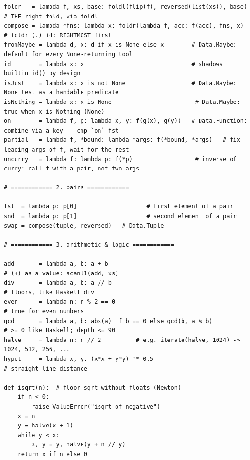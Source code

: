 \documentclass[10pt,letterpaper]{book}
\begin{document}
\begin{lstlisting}[style=file]
foldr   = lambda f, xs, base: foldl(flip(f), reversed(list(xs)), base)  # THE right fold, via foldl
compose = lambda *fns: lambda x: foldr(lambda f, acc: f(acc), fns, x)   # foldr (.) id: RIGHTMOST first
fromMaybe = lambda d, x: d if x is None else x        # Data.Maybe: default for every None-returning tool
id        = lambda x: x                               # shadows builtin id() by design
isJust    = lambda x: x is not None                   # Data.Maybe: None test as a handable predicate
isNothing = lambda x: x is None                        # Data.Maybe: true when x is Nothing (None)
on        = lambda f, g: lambda x, y: f(g(x), g(y))   # Data.Function: combine via a key -- cmp `on` fst
partial   = lambda f, *bound: lambda *args: f(*bound, *args)   # fix leading args of f, wait for the rest
uncurry   = lambda f: lambda p: f(*p)                  # inverse of curry: call f with a pair, not two args

# ============ 2. pairs ============

fst  = lambda p: p[0]                    # first element of a pair
snd  = lambda p: p[1]                    # second element of a pair
swap = compose(tuple, reversed)   # Data.Tuple

# ============ 3. arithmetic & logic ============

add       = lambda a, b: a + b                                           # (+) as a value: scanl1(add, xs)
div       = lambda a, b: a // b                                          # floors, like Haskell div
even      = lambda n: n % 2 == 0                                         # true for even numbers
gcd       = lambda a, b: abs(a) if b == 0 else gcd(b, a % b)             # >= 0 like Haskell; depth <= 90
halve     = lambda n: n // 2          # e.g. iterate(halve, 1024) -> 1024, 512, 256, ...
hypot     = lambda x, y: (x*x + y*y) ** 0.5                              # straight-line distance

def isqrt(n):  # floor sqrt without floats (Newton)
    if n < 0:
        raise ValueError("isqrt of negative")
    x = n
    y = halve(x + 1)
    while y < x:
        x, y = y, halve(y + n // y)
    return x if n else 0


\end{lstlisting}
\end{document}
